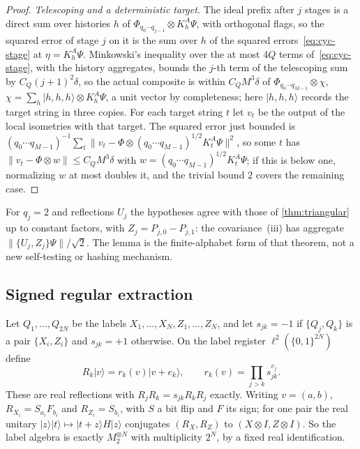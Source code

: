 \begin{proof}
\emph{Telescoping and a deterministic target.} The ideal prefix after $j$ stages is a direct sum over histories $h$ of
$\Phi_{q_0\cdots q_{j-1}}\otimes K^A_h\Psi$, with orthogonal flags, so the squared error of stage $j$ on it is the sum over $h$ of the
squared errors~\eqref{eq:cyc-stage} at $\eta=K^A_h\Psi$. Minkowski's inequality over the at most $4Q$ terms of~\eqref{eq:cyc-stage}, with
the history aggregates, bounds the $j$-th term of the telescoping sum by $C_Q(j+1)^2\delta$, so the actual composite is within $C_QM^3\delta$ of
$\Phi_{q_0\cdots q_{M-1}}\otimes\chi$, $\chi=\sum_h|h,h,h\rangle\otimes K^A_h\Psi$, a unit vector by completeness; here $|h,h,h\rangle$ records the
target string in three copies. For each target string $t$ let $v_t$ be the output of the local isometries with that target. The squared
error just bounded is $(q_0\cdots q_{M-1})^{-1}\sum_t\|v_t-\Phi\otimes(q_0\cdots q_{M-1})^{1/2}K^A_t\Psi\|^2$, so some $t$ has
$\|v_t-\Phi\otimes w\|\le C_QM^3\delta$ with $w=(q_0\cdots q_{M-1})^{1/2}K^A_t\Psi$; if this is below one, normalizing $w$ at most doubles
it, and the trivial bound $2$ covers the remaining case.
\end{proof}

For $q_j=2$ and reflections $U_j$ the hypotheses agree with those of \cref{thm:triangular} up to constant factors, with $Z_j=P_{j,0}-P_{j,1}$:
the covariance~(iii) has aggregate $\|\{U_j,Z_j\}\Psi\|/\sqrt2$. The lemma is the finite-alphabet form of that theorem, not a new
self-testing or hashing mechanism.

\subsection{Signed regular extraction}\label{sec:signed-regular}

Let $Q_1,\dots,Q_{2N}$ be the labels $X_1,\dots,X_N,Z_1,\dots,Z_N$, and let $s_{jk}=-1$ if $\{Q_j,Q_k\}$ is a pair
$\{X_i,Z_i\}$ and $s_{jk}=+1$ otherwise. On the label register $\ell^2(\{0,1\}^{2N})$ define
\begin{equation}\label{eq:label-paulis}
R_k|v\rangle=r_k(v)|v+e_k\rangle,\qquad r_k(v)=\prod_{j>k}s_{jk}^{v_j}.
\end{equation}
These are real reflections with $R_jR_k=s_{jk}R_kR_j$ exactly. Writing $v=(a,b)$, $R_{X_i}=S_{a_i}F_{b_i}$ and
$R_{Z_i}=S_{b_i}$, with $S$ a bit flip and $F$ its sign; for one pair the real unitary $|z\rangle|t\rangle\mapsto
|t+z\rangle H|z\rangle$ conjugates $(R_X,R_Z)$ to $(X\otimes I,Z\otimes I)$. So the label algebra is exactly
$M_2^{\otimes N}$ with multiplicity $2^N$, by a fixed real identification.

